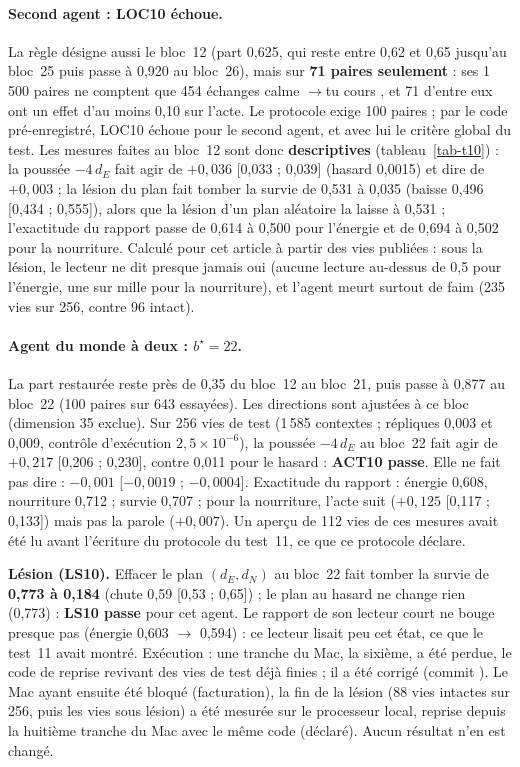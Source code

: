 \documentclass[11pt,a4paper]{article}
\newcommand{\dE}{d_{E}}
\newcommand{\dN}{d_{N}}
\newcommand{\code}[1]{\texttt{\detokenize{#1}}}
\begin{document}
\paragraph{Second agent : LOC10 échoue.} La règle désigne aussi le bloc~12
(part 0,625, qui reste entre 0,62 et 0,65 jusqu'au bloc~25 puis passe à 0,920 au
bloc~26), mais sur \textbf{71 paires seulement} : ses 1\,500 paires ne comptent que
454 échanges \og calme \fg{}$\to$\og tu cours \fg{}, et 71 d'entre eux ont un effet
d'au moins 0,10 sur l'acte. Le protocole exige 100 paires ; par le code
pré-enregistré, LOC10 échoue pour le second agent, et avec lui le critère global du
test. Les mesures faites au bloc~12 sont donc \textbf{descriptives}
(tableau~\ref{tab-t10}) : la poussée $-4\,\dE$ fait agir de $+0,036$ [0,033 ; 0,039]
(hasard 0,0015) et dire de $+0,003$ ; la lésion du plan fait tomber la survie de
0,531 à 0,035 (baisse 0,496 [0,434 ; 0,555]), alors que la lésion d'un plan aléatoire
la laisse à 0,531 ; l'exactitude du rapport passe de 0,614 à 0,500 pour l'énergie et
de 0,694 à 0,502 pour la nourriture. Calculé pour cet article à partir des vies
publiées : sous la lésion, le lecteur ne dit presque jamais \og oui \fg{} (aucune
lecture au-dessus de 0,5 pour l'énergie, une sur mille pour la nourriture), et
l'agent meurt surtout de faim (235 vies sur 256, contre 96 intact).

\paragraph{Agent du monde à deux : $b^\star=22$.} La part restaurée reste près de
0,35 du bloc~12 au bloc~21, puis passe à 0,877 au bloc~22 (100 paires sur 643
essayées). Les directions sont ajustées à ce bloc (dimension 35 exclue). Sur 256
vies de test (1\,585 contextes ; répliques 0,003 et 0,009, contrôle d'exécution
$2,5\times10^{-6}$), la poussée $-4\,\dE$ au bloc~22 fait agir de
$+0,217$ [0,206 ; 0,230], contre 0,011 pour le hasard : \textbf{ACT10 passe}. Elle ne fait pas dire : $-0,001$
[$-0,0019$ ; $-0,0004$]. Exactitude du rapport : énergie 0,608, nourriture 0,712 ;
survie 0,707 ; pour la nourriture, l'acte suit ($+0,125$ [0,117 ; 0,133]) mais pas
la parole ($+0,007$). Un aperçu de 112 vies de ces mesures avait été lu avant
l'écriture du protocole du test~11, ce que ce protocole déclare.

\textbf{Lésion (LS10).} Effacer le plan $(\dE,\dN)$ au bloc~22 fait tomber la survie
de \textbf{0,773 à 0,184} (chute 0,59 [0,53 ; 0,65]) ; le plan au hasard ne change
rien (0,773) : \textbf{LS10 passe} pour cet agent. Le rapport de son lecteur court ne
bouge presque pas (énergie 0,603 $\to$ 0,594) : ce lecteur lisait peu cet état, ce que
le test~11 avait montré. Exécution : une tranche du Mac, la sixième, a été perdue, le
code de reprise revivant des vies de test déjà finies ; il a été corrigé (commit
\code{de2c1b4}). Le Mac ayant ensuite été bloqué (facturation), la fin de la lésion
(88 vies intactes sur 256, puis les vies sous lésion) a été mesurée sur le processeur
local, reprise depuis la huitième tranche du Mac avec le même code (déclaré). Aucun
résultat n'en est changé.
\end{document}
